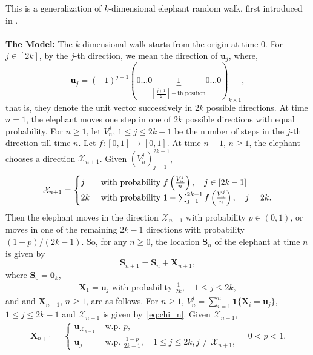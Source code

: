 \documentclass[12pt]{amsart}
\theoremstyle{plain}
\theoremstyle{remark}
\numberwithin{equation}{section}
\begin{document}
This is a generalization of $k$-dimensional elephant random walk, first introduced in \cite{bercu2019multi}. \hfill \\\\
\textbf{The Model:} The $k$-dimensional walk starts from the origin at time $0$. {For $j \in [2k]$, by the $j$-th direction, we mean the direction of $\boldsymbol{u}_{j}$}, where, \textcolor{black}{\[\boldsymbol{u}_{j} = (-1)^{j+1}(
0  \ldots  0  \underbrace{1}_{\left\lfloor\frac{j+1}{2}\right\rfloor-\text{th position}}  0 \ldots  0
)_{k \times 1},\]}that is, they denote the unit vector successively in $2k$ possible directions. At time $n = 1$, the elephant moves one step in one of $2k$ possible directions with equal probability. For $n \geq 1$, let $V^j_n$, $1 \leq j \leq 2k-1$ be the number of steps in the $j$-th direction till time $n$. Let $f : [0,1] \to [0,1]$. At time $n + 1$, $n \geq 1$, the elephant chooses a direction $\mathcal{X}_{n+1}$. 
Given $\left(V^j_n\right)_{j=1}^{2k-1}$, \begin{align}\label{eq:chi_n}\mathcal{X}_{n+1} = \begin{cases} j &\text{ \text{with probability} }f\left(\frac{V^j_n}{n}\right), \quad j \in [2k-1] \\ 2k &\text{ \text{with probability} }1-\sum_{j=1}^{2k-1}f\left(\frac{V^j_n}{n}\right), \quad j = 2k.\end{cases}\end{align} Then the elephant moves in the direction $\mathcal{X}_{n+1}$ with probability $p \in (0,1)$, or moves in one of the remaining $2k-1$ directions with probability $(1-p)/(2k-1)$.
So, for any $n\geq 0$, the location $\boldsymbol{S}_n$ of the elephant at time $n$ is given by
\[
    \boldsymbol{S}_{n+1} = \boldsymbol{S}_{n} + \boldsymbol{X}_{n+1},
\]
where $\boldsymbol{S}_0 = \boldsymbol{0}_k$, \begin{align*}\boldsymbol{X}_{1} = \boldsymbol{u}_j \text{ with probability } \frac{1}{2k}, \quad 1 \leq j \leq 2k,\end{align*} and and $\boldsymbol{X}_{n+1}$, $n \geq 1$, are as follows. For $n \geq 1$, $V^j_{n} = \sum_{i=1}^n \boldsymbol{1}\{\boldsymbol{X}_i = \boldsymbol{u}_{j}\}$, $1 \leq j \leq 2k-1$ and $\mathcal{X}_{n+1}$ is given by~\eqref{eq:chi_n}.
Given $\mathcal{X}_{n+1}$,
\begin{align*}
   \boldsymbol{X}_{n+1} = \begin{cases} \boldsymbol{u}_{\mathcal{X}_{n+1}} &\text{ w.p. } p, \\ \boldsymbol{u}_{j}
&\text{ w.p. } \frac{1-p}{2k-1}, \quad 1 \leq j \leq 2k, j \neq \mathcal{X}_{n+1}, \end{cases} \quad 0 < p < 1.
\end{align*} 
\end{document}
